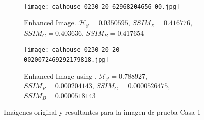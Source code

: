 \begin{figure}[H]
\begin{subfigure}[t]{0.45mm}
        \label{fig:casa1enhanced1}
    \end{subfigure}
    ~ %
    \begin{subfigure}[t]{width=45mm}
        \texttt{[image: calhouse\_0230\_20-62968204656-00.jpg]}
        \caption{Enhanced Image.  $\mathscr{H_Y}=0.0350595$, $SSIM_R=0.416776$, $SSIM_G=0.403636$, $SSIM_B=0.417654$}
        \label{fig:casa1enhanced2}
    \end{subfigure} 
    \begin{subfigure}[t]{width=0.45mm}
        \texttt{[image: calhouse\_0230\_20-20-0020072469292179818.jpg]}
        \caption{Enhanced Image using \cite{morepso}. $\mathscr{H_Y}=0.788927$, $SSIM_R=0.000204143$, $SSIM_G=0.0000526475$, $SSIM_B=0.0000518143$}
        \label{fig:casa1enhanced3}
    \end{subfigure}

    \caption{Imágenes original y resultantes para la imagen de prueba Casa 1}\label{fig:casa1}
\end{figure}


\begin{table}[H]
\setlength{\abovecaptionskip}{2pt plus 3pt minus 2pt} %
\caption[Parámetros de entrada para $MOPSO$]{Coeficientes de las métricas obtenidas utilizando CMOPSO-CLAHE para algunos resultados no dominados de la imagen en la Figura (\ref{fig:casa1}), además de los coeficientes obtenidos con el enfoque de \cite{morepso}, el cual se muestra en la última línea.}
\begin{center}
\end{center}
\label{table:nodominadas}
\end{table}


